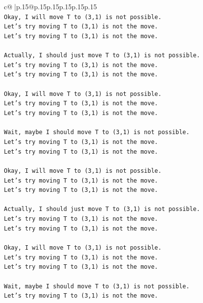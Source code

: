 \documentclass{article}
\begin{document}
{\begin{supertabular}{c@{$\;$}|p{.15\linewidth}@{}p{.15\linewidth}p{.15\linewidth}p{.15\linewidth}p{.15\linewidth}p{.15\linewidth}}
{{{\\ 
\texttt{Okay, I will move T to (3,1) is not possible.} \\
\texttt{Let's try moving T to (3,1) is not the move.} \\
\texttt{Let's try moving T to (3,1) is not the move.} \\
\\ 
\texttt{Actually, I should just move T to (3,1) is not possible.} \\
\texttt{Let's try moving T to (3,1) is not the move.} \\
\texttt{Let's try moving T to (3,1) is not the move.} \\
\\ 
\texttt{Okay, I will move T to (3,1) is not possible.} \\
\texttt{Let's try moving T to (3,1) is not the move.} \\
\texttt{Let's try moving T to (3,1) is not the move.} \\
\\ 
\texttt{Wait, maybe I should move T to (3,1) is not possible.} \\
\texttt{Let's try moving T to (3,1) is not the move.} \\
\texttt{Let's try moving T to (3,1) is not the move.} \\
\\ 
\texttt{Okay, I will move T to (3,1) is not possible.} \\
\texttt{Let's try moving T to (3,1) is not the move.} \\
\texttt{Let's try moving T to (3,1) is not the move.} \\
\\ 
\texttt{Actually, I should just move T to (3,1) is not possible.} \\
\texttt{Let's try moving T to (3,1) is not the move.} \\
\texttt{Let's try moving T to (3,1) is not the move.} \\
\\ 
\texttt{Okay, I will move T to (3,1) is not possible.} \\
\texttt{Let's try moving T to (3,1) is not the move.} \\
\texttt{Let's try moving T to (3,1) is not the move.} \\
\\ 
\texttt{Wait, maybe I should move T to (3,1) is not possible.} \\
\texttt{Let's try moving T to (3,1) is not the move.} \\
}}}
\end{supertabular}}
\end{document}
